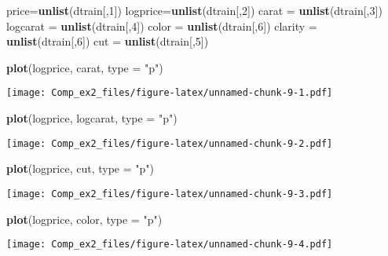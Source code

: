 \documentclass[]{article}
\newenvironment{Shaded}{\begin{snugshade}}{\end{snugshade}}
\newcommand{\KeywordTok}[1]{\textcolor[rgb]{0.13,0.29,0.53}{\textbf{#1}}}
\newcommand{\DataTypeTok}[1]{\textcolor[rgb]{0.13,0.29,0.53}{#1}}
\newcommand{\DecValTok}[1]{\textcolor[rgb]{0.00,0.00,0.81}{#1}}
\newcommand{\StringTok}[1]{\textcolor[rgb]{0.31,0.60,0.02}{#1}}
\newcommand{\NormalTok}[1]{#1}
\begin{document}
\begin{Shaded}
\begin{Highlighting}[]
\NormalTok{price=}\KeywordTok{unlist}\NormalTok{(dtrain[,}\DecValTok{1}\NormalTok{])}
\NormalTok{logprice=}\KeywordTok{unlist}\NormalTok{(dtrain[,}\DecValTok{2}\NormalTok{])}
\NormalTok{carat =}\StringTok{ }\KeywordTok{unlist}\NormalTok{(dtrain[,}\DecValTok{3}\NormalTok{])}
\NormalTok{logcarat =}\StringTok{ }\KeywordTok{unlist}\NormalTok{(dtrain[,}\DecValTok{4}\NormalTok{])}
\NormalTok{color =}\StringTok{ }\KeywordTok{unlist}\NormalTok{(dtrain[,}\DecValTok{6}\NormalTok{])}
\NormalTok{clarity =}\StringTok{ }\KeywordTok{unlist}\NormalTok{(dtrain[,}\DecValTok{6}\NormalTok{])}
\NormalTok{cut =}\StringTok{ }\KeywordTok{unlist}\NormalTok{(dtrain[,}\DecValTok{5}\NormalTok{])}

\KeywordTok{plot}\NormalTok{(logprice, carat, }\DataTypeTok{type =} \StringTok{"p"}\NormalTok{) }
\end{Highlighting}
\end{Shaded}

\texttt{[image: Comp\_ex2\_files/figure-latex/unnamed-chunk-9-1.pdf]}

\begin{Shaded}
\begin{Highlighting}[]
\KeywordTok{plot}\NormalTok{(logprice, logcarat, }\DataTypeTok{type =} \StringTok{"p"}\NormalTok{) }
\end{Highlighting}
\end{Shaded}

\texttt{[image: Comp\_ex2\_files/figure-latex/unnamed-chunk-9-2.pdf]}

\begin{Shaded}
\begin{Highlighting}[]
\KeywordTok{plot}\NormalTok{(logprice, cut, }\DataTypeTok{type =} \StringTok{"p"}\NormalTok{)}
\end{Highlighting}
\end{Shaded}

\texttt{[image: Comp\_ex2\_files/figure-latex/unnamed-chunk-9-3.pdf]}

\begin{Shaded}
\begin{Highlighting}[]
\KeywordTok{plot}\NormalTok{(logprice, color, }\DataTypeTok{type =} \StringTok{"p"}\NormalTok{)}
\end{Highlighting}
\end{Shaded}

\texttt{[image: Comp\_ex2\_files/figure-latex/unnamed-chunk-9-4.pdf]}
\end{document}
